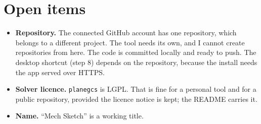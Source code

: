 \documentclass[10pt,a4paper]{article}
\newcommand{\code}[1]{\texttt{#1}}
\begin{document}
\section{Open items}\label{sec:open}

\begin{itemize}
\item \textbf{Repository.} The connected GitHub account has one repository,
which belongs to a different project. The tool needs its own, and I cannot
create repositories from here. The code is committed locally and ready to
push. The desktop shortcut (step 8) depends on the repository, because the
install needs the app served over HTTPS.
\item \textbf{Solver licence.} \code{planegcs} is LGPL. That is fine for a
personal tool and for a public repository, provided the licence notice is
kept; the README carries it.
\item \textbf{Name.} ``Mech Sketch'' is a working title.
\end{itemize}
\end{document}
